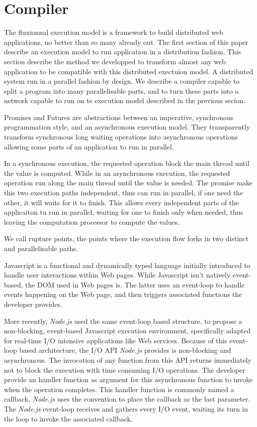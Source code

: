 \section{Compiler} \label{section:compiler}

The fluxionnal execution model is a framework to build distributed web applications, no better than so many already out.
The first section of this paper describe an execution model to run application in a distribution fashion.
This section describe the method we developped to transform almost any web application to be compatible with this distributed exectuion model.
A distributed system run in a parallel fashion by design.
We describe a compiler capable to split a program into many parallelisable parts, and to turn these parts into a network capable to run on te execution model described in the previous secion.

Promises\cite{Liskov1988} and Futures are abstractions between an imperative, synchronous programmation style, and an asynchronous execution model.
They transparently transform synchronous long waiting operations into asynchronous operations allowing some parts of an application to run in parallel.

In a synchronous execution, the requested operation block the main thread until the value is computed.
While in an asynchronous execution, the requested operation run along the main thread until the value is needed.
The promise make this two execution paths independent, thus can run in parallel, if one need the other, it will waits for it to finish.
This allows every independent parts of the applicaiton tu run in parallel, waiting for one to finish only when needed, thus leaving the computation processor to compute the values.

We call rupture points, the points where the execution flow forks in two distinct and parallelisable paths.

Javascript is a functional and dynamically typed language initially introduced to handle user interactions within Web pages.
While Javascript isn't natively event-based, the DOM used in Web pages is.
The latter uses an event-loop to handle events happening on the Web page, and then triggers associated functions the developer provides.

More recently, \textit{Node.js} used the same event-loop based structure, to propose a non-blocking, event-based Javascript execution environment, specifically adapted for real-time I/O intensive applications like Web services.
Because of this event-loop based architecture, the I/O API \textit{Node.js} provides is non-blocking and asynchronous.
The invocation of any function from this API returns immediately not to block the execution with time consuming I/O operations.
The developer provide an handler function as argument for this asynchronous function to invoke when the operation completes.
This handler function is commonly named a callback, \textit{Node.js} uses the convention to place the callback as the last parameter.
The \textit{Node.js} event-loop receives and gathers every I/O event, waiting its turn in the loop to invoke the associated callback.

